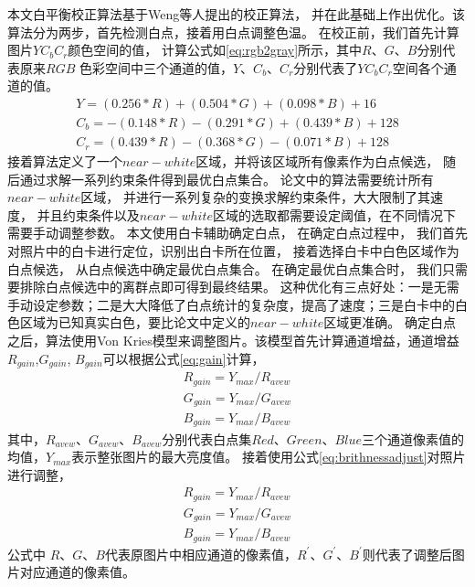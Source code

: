 本文白平衡校正算法基于Weng\cite{weng2005novel}等人提出的校正算法，
并在此基础上作出优化。该算法分为两步，首先检测白点，接着用白点调整色温。
在校正前，我们首先计算图片$YC_b C_r$颜色空间的值，
计算公式如\eqref{eq:rgb2gray}所示，其中$R$、$G$、$B$分别代表原来$RGB$
色彩空间中三个通道的值，$Y$、$C_b$、$C_r$分别代表了$YC_b C_r$空间各个通道的值。
\begin{equation}\label{eq:rgb2gray}
\begin{split}
Y=(0.256\ast R)+ (0.504\ast G)+(0.098\ast B)+16\\
C_b=-(0.148\ast R)-(0.291\ast G)+(0.439\ast B)+128\\
C_r=(0.439\ast R)-(0.368\ast G)-(0.071\ast B)+128
\end{split}
\end{equation}
接着算法定义了一个$near-white$区域，并将该区域所有像素作为白点候选，
随后通过求解一系列约束条件得到最优白点集合。
论文中的算法需要统计所有$near-white$区域，
并进行一系列复杂的变换求解约束条件，大大限制了其速度，
并且约束条件以及$near-white$区域的选取都需要设定阈值，在不同情况下需要手动调整参数。
本文使用白卡辅助确定白点，
在确定白点过程中，
我们首先对照片中的白卡进行定位，识别出白卡所在位置，
接着选择白卡中白色区域作为白点候选，
从白点候选中确定最优白点集合。
在确定最优白点集合时，
我们只需要排除白点候选中的离群点即可得到最终结果。
这种优化有三点好处：一是无需手动设定参数；二是大大降低了白点统计的复杂度，提高了速度；三是白卡中的白色区域为已知真实白色，要比论文中定义的$near-white$区域更准确。
确定白点之后，算法使用Von Kries模型\cite{macadam1970sources}来调整图片。该模型首先计算通道增益，通道增益$R_{gain}$,$ G_{gain}$, $B_{gain}$可以根据公式\eqref{eq:gain}计算，
\begin{equation}\label{eq:gain}
\begin{split}
R_{gain}=Y_{max}/R_{avew}\\
G_{gain}=Y_{max}/G_{avew}\\
B_{gain}=Y_{max}/B_{avew}
\end{split}
\end{equation}
其中，$R_{avew}$、$G_{avew}$、$B_{avew}$分别代表白点集$Red$、$Green$、$Blue$三个通道像素值的均值，$Y_{max}$表示整张图片的最大亮度值。
接着使用公式\eqref{eq:brithnessadjust}对照片进行调整，
\begin{equation}\label{eq:brithnessadjust}
\begin{split}
R_{gain}=Y_{max}/R_{avew}\\
G_{gain}=Y_{max}/G_{avew}\\
B_{gain}=Y_{max}/B_{avew}
\end{split}
\end{equation}
公式中 $R$、$G$、$B$代表原图片中相应通道的像素值，$R^{'}$、$G^{'}$、$B^{'}$则代表了调整后图片对应通道的像素值。

